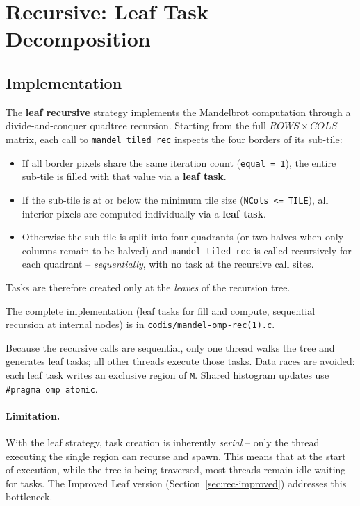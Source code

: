 \section{Recursive: Leaf Task Decomposition}
\label{sec:rec-leaf}

\subsection{Implementation}
\label{sec:rec-leaf-impl}

The \textbf{leaf recursive} strategy implements the Mandelbrot computation through a
divide-and-conquer quadtree recursion.
Starting from the full $\mathit{ROWS}\times\mathit{COLS}$ matrix, each call to
\texttt{mandel\_tiled\_rec} inspects the four borders of its sub-tile:

\begin{itemize}
    \item If all border pixels share the same iteration count (\texttt{equal = 1}),
          the entire sub-tile is filled with that value via a \textbf{leaf task}.
    \item If the sub-tile is at or below the minimum tile size (\texttt{NCols <= TILE}),
          all interior pixels are computed individually via a \textbf{leaf task}.
    \item Otherwise the sub-tile is split into four quadrants (or two halves when only
          columns remain to be halved) and \texttt{mandel\_tiled\_rec} is called
          recursively for each quadrant -- \emph{sequentially}, with no task at the
          recursive call sites.
\end{itemize}

Tasks are therefore created only at the \emph{leaves} of the recursion tree.

The complete implementation (leaf tasks for fill and compute, sequential recursion at internal nodes) is in \texttt{codis/mandel-omp-rec(1).c}.

Because the recursive calls are sequential, only one thread walks the tree and generates
leaf tasks; all other threads execute those tasks.
Data races are avoided: each leaf task writes an exclusive region of \texttt{M}.
Shared histogram updates use \texttt{\#pragma~omp~atomic}.

\paragraph{Limitation.}
With the leaf strategy, task creation is inherently \emph{serial} -- only the thread
executing the single region can recurse and spawn.
This means that at the start of execution, while the tree is being traversed, most
threads remain idle waiting for tasks.
The Improved Leaf version (Section~\ref{sec:rec-improved}) addresses this bottleneck.

